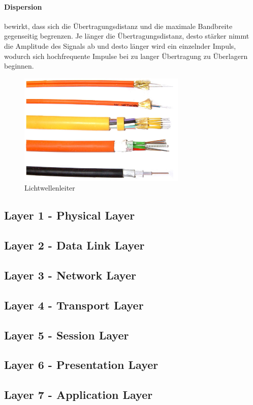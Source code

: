 \documentclass{article}
\begin{document}
\paragraph{Dispersion}
bewirkt, dass sich die Übertragungsdistanz und die maximale Bandbreite gegenseitig begrenzen. Je länger die Übertragungsdistanz, desto stärker nimmt die Amplitude des Signals ab und desto länger wird ein einzelnder Impuls, wodurch sich hochfrequente Impulse bei zu langer Übertragung zu Überlagern beginnen.
\begin{figure}[h!]
		\begin{center}
		\includegraphics[width=8cm]{img/lwl.png}
		\end{center}
		\caption{Lichtwellenleiter}
		\label{fig:Lichtwellenleiter}
\end{figure}
\subsection{Layer 1 - Physical Layer}
\subsection{Layer 2 - Data Link Layer}
\subsection{Layer 3 - Network Layer}
\subsection{Layer 4 - Transport Layer}
\subsection{Layer 5 - Session Layer}
\subsection{Layer 6 - Presentation Layer}
\subsection{Layer 7 - Application Layer}
\end{document}
